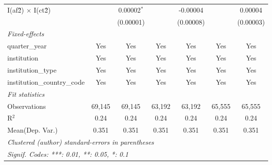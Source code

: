 \begin{tabular}{lcccccc}
   I(af\^2) $\times$ I(ct\^2)         &               & 0.00002$^{*}$   &               & -0.00004        &               & 0.00004\\   
                                      &               & (0.00001)       &               & (0.00008)       &               & (0.00003)\\   
   \midrule
   \emph{Fixed-effects}\\
   quarter\_year                      & Yes           & Yes             & Yes           & Yes             & Yes           & Yes\\  
   institution                        & Yes           & Yes             & Yes           & Yes             & Yes           & Yes\\  
   institution\_type                  & Yes           & Yes             & Yes           & Yes             & Yes           & Yes\\  
   institution\_country\_code         & Yes           & Yes             & Yes           & Yes             & Yes           & Yes\\  
   \midrule
   \emph{Fit statistics}\\
   Observations                       & 69,145        & 69,145          & 63,192        & 63,192          & 65,555        & 65,555\\  
   R$^2$                              & 0.24          & 0.24            & 0.24          & 0.24            & 0.24          & 0.24\\  
Mean(Dep. Var.) & 0.351 & 0.351 & 0.351 & 0.351 & 0.351 & 0.351 \\
   \midrule \midrule
   \multicolumn{7}{l}{\emph{Clustered (author) standard-errors in parentheses}}\\
   \multicolumn{7}{l}{\emph{Signif. Codes: ***: 0.01, **: 0.05, *: 0.1}}\\
\end{tabular}
\par\endgroup
